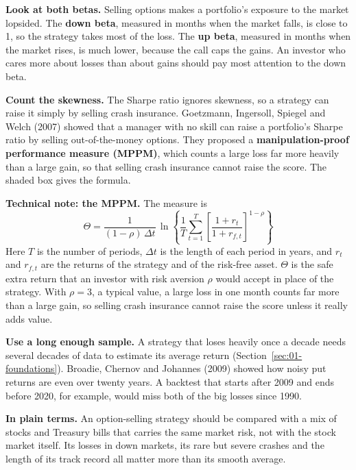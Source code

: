 \textbf{Look at both betas.} Selling options makes a portfolio's exposure to the market lopsided. The \textbf{down beta}, measured in months when the market falls, is close to 1, so the strategy takes most of the loss. The \textbf{up beta}, measured in months when the market rises, is much lower, because the call caps the gains. An investor who cares more about losses than about gains should pay most attention to the down beta.

\textbf{Count the skewness.} The Sharpe ratio ignores skewness, so a strategy can raise it simply by selling crash insurance. Goetzmann, Ingersoll, Spiegel and Welch (2007) showed that a manager with no skill can raise a portfolio's Sharpe ratio by selling out-of-the-money options. They proposed a \textbf{manipulation-proof performance measure (MPPM)}, which counts a large loss far more heavily than a large gain, so that selling crash insurance cannot raise the score. The shaded box gives the formula.

\begin{technote}
\textbf{Technical note: the MPPM.} The measure is
\begin{equation}
  \Theta = \frac{1}{(1 - \rho)\,\Delta t}\,\ln\!\left\{\frac{1}{T}\sum_{t=1}^{T}\left[\frac{1 + r_t}{1 + r_{f,t}}\right]^{1-\rho}\right\}
  \label{eq:16-mppm}
\end{equation}
Here $T$ is the number of periods, $\Delta t$ is the length of each period in years, and $r_t$ and $r_{f,t}$ are the returns of the strategy and of the risk-free asset. $\Theta$ is the safe extra return that an investor with risk aversion $\rho$ would accept in place of the strategy. With $\rho = 3$, a typical value, a large loss in one month counts far more than a large gain, so selling crash insurance cannot raise the score unless it really adds value.
\end{technote}

\textbf{Use a long enough sample.} A strategy that loses heavily once a decade needs several decades of data to estimate its average return (Section~\ref{sec:01-foundations}). Broadie, Chernov and Johannes (2009) showed how noisy put returns are even over twenty years. A backtest that starts after 2009 and ends before 2020, for example, would miss both of the big losses since 1990.

\noindent\textbf{In plain terms.} An option-selling strategy should be compared with a mix of stocks and Treasury bills that carries the same market risk, not with the stock market itself. Its losses in down markets, its rare but severe crashes and the length of its track record all matter more than its smooth average.

